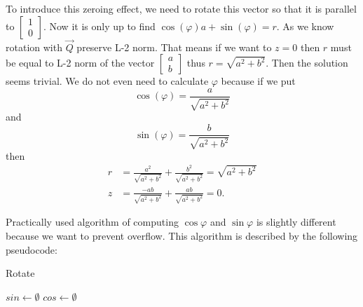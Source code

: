To introduce this zeroing effect, we need to rotate this vector so that it is parallel to $
\begin{bmatrix} 
    1 \\
    0
\end{bmatrix}
$. Now it is only up to find  $\cos(\varphi) a + \sin(\varphi) = r $.
As we know rotation with $\vec{Q}$ preserve L-2 norm. That means if we want to $z = 0$  then $r$ must be equal to L-2 norm of the vector  
$
\begin{bmatrix} 
    a \\
    b
\end{bmatrix}
$  thus $r = \sqrt{a^2 + b^2}$. 
Then the solution seems trivial. We do not even need to calculate $\varphi$ because if we put
\begin{equation} \label{givens_cos}
    \cos(\varphi) = \frac{a}{\sqrt{a^2 + b^2}} 
\end{equation}
and   
\begin{equation} \label{givens_sin}
    \sin(\varphi) = \frac{b}{\sqrt{a^2 + b^2}} 
\end{equation}
then 
\begin{align}
    r &= \frac{a^2}{\sqrt{a^2 + b^2}} + \frac{b^2}{\sqrt{a^2 + b^2}} = \sqrt{a^2 + b^2} \\
    z &= \frac{-ab}{\sqrt{a^2 + b^2}} +  \frac{ab}{\sqrt{a^2 + b^2}} = 0.
\end{align}

Practically used algorithm of computing $\cos{\varphi}$ and  $\sin{\varphi}$ is slightly different because we want to prevent overflow. This algorithm is described by the following pseudocode:


\begin{algorithm}[H]
    \label{alg:givens}
    \caption{Rotate}
    $sin \gets \emptyset$\;
    $cos \gets \emptyset$\;
    \;
\end{algorithm}

